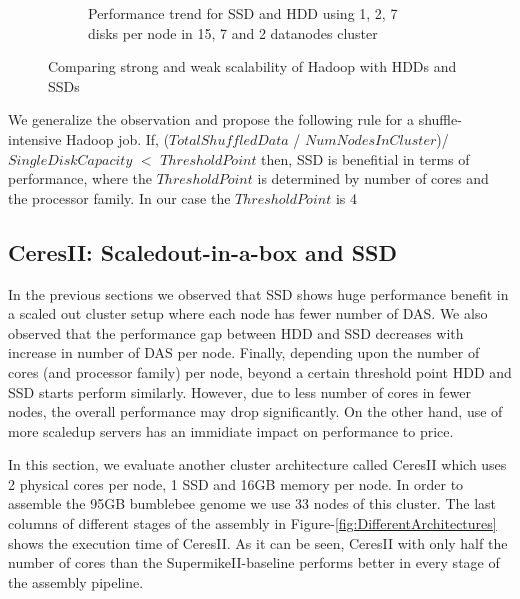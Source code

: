 \documentclass[conference]{IEEEtran}
\begin{document}
\begin{figure}[h]
\begin{subfigure}[b]{0.23\textwidth}
          \caption{Performance trend for SSD and HDD using 1, 2, 7 disks per node in 15, 7 and 2 datanodes cluster}
          \label{fig:SsdNHddDiffNodes}
  \end{subfigure}
  \caption{Comparing strong and weak scalability of Hadoop with HDDs and SSDs}
  \label{fig:SsdNHdd}
\end{figure}
We generalize the observation and propose the following rule for a shuffle-intensive Hadoop job.
If,  
($TotalShuffledData$ / $NumNodesInCluster$)/ $SingleDiskCapacity$ $<$ $ThresholdPoint $
then, SSD is benefitial in terms of performance, where the $ThresholdPoint$ is determined by number of cores and the processor family. In our case the $ThresholdPoint$ is 4

\subsection {CeresII: Scaledout-in-a-box and SSD} \label{CeresII:Scaledout-in-a-boxAndSSD}
In the previous sections we observed that SSD shows huge performance benefit in a scaled out cluster setup where each node has fewer number of DAS.
We also observed that the performance gap between HDD and SSD decreases with increase in number of DAS per node.
Finally, depending upon the number of cores (and processor family) per node, beyond a certain threshold point HDD and SSD starts perform similarly.
However, due to less number of cores in fewer nodes, the overall performance may drop significantly. On the other hand, use of more scaledup servers has an immidiate impact on performance to price.

In this section, we evaluate another cluster architecture called CeresII which uses 2 physical cores per node, 1 SSD and 16GB memory per node.  In order to assemble the 95GB bumblebee genome we use 33 nodes of this cluster.
The last columns of different stages of the assembly in Figure-\ref{fig:DifferentArchitectures} shows the execution time of CeresII.
As it can be seen, CeresII with only half the number of cores than the SupermikeII-baseline performs better in every stage of the assembly pipeline.

\end{document}
